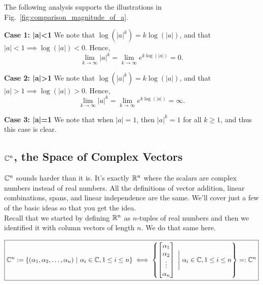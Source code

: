 The following analysis supports the illustrations in Fig.~\ref{fig:comparison_magnitude_of_a}.

\vspace*{0.2cm}

\textbf{Case 1: |a|<1} We note that $\log(|a|^k) = k \log(|a|)$, and that $|a|<1 \implies \log(|a|) < 0.$ Hence, 
$$\lim_{k \to \infty} |a|^k = \lim_{k \to \infty} e^{k \log(|a|)} = 0. $$
\vspace*{0.2cm}


\textbf{Case 2: |a|>1} We note that $\log(|a|^k) = k \log(|a|)$, and that $|a|> 1 \implies \log(|a|) > 0.$ Hence, 
$$\lim_{k \to \infty} |a|^k = \lim_{k \to \infty} e^{k \log(|a|)} = \infty. $$ 
\vspace*{0.2cm}

\textbf{Case 3: |a|=1} We note that when $|a|=1$, then $|a|^k=1$ for all $k\ge 1$, and thus this case is clear. 
\vspace*{0.2cm}



\subsection{$\mathbb C^n$, the Space of Complex Vectors}

$\mathbb C^n$ sounds harder than it is. It's exactly $\mathbb R^n$ where  the scalars are complex numbers instead of real numbers. All the definitions of vector addition, linear combinations, spans, and linear independence are the same. We'll cover just a few of the basic ideas so that you get the idea.\\

Recall that we started by defining $\mathbb R^n$ as $n$-tuples of real numbers and then we identified it with column vectors of length $n$. We do that same here. 

\begin{equation}
\boxed{\mathbb C^n:=\{(\alpha_1, \alpha_2, \ldots, \alpha_n)~|~\alpha_i \in \mathbb C, 1\le i \le n \} \iff \left\{\begin{bmatrix} \alpha_1 \\ \alpha_2 \\ \vdots \\ \alpha_n\end{bmatrix} ~\Bigg|~  \alpha_i \in \mathbb C, 1\le i \le n \right\}=:\mathbb C^n}
\end{equation}


